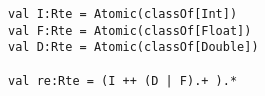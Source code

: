 \begin{lstlisting}[style=reclojureScala]
val I:Rte = Atomic(classOf[Int])
val F:Rte = Atomic(classOf[Float])
val D:Rte = Atomic(classOf[Double])

val re:Rte = (I ++ (D | F).+ ).*
\end{lstlisting}
